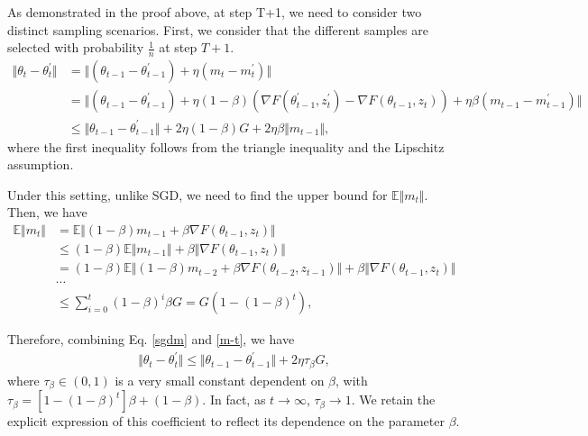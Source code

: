 As demonstrated in the proof above, at step T+1, we need to consider two distinct sampling scenarios. First, we consider that the different samples are selected with probability $\frac{1}{n}$ at step $T+1$.  
\begin{equation}\label{sgdm}
  \begin{aligned}
   \Vert \theta_t -\theta_t^{\prime} \Vert &= \Vert  (\theta_{t-1} - \theta_{t-1}^{\prime}) + \eta (m_t - m_t^{\prime})\Vert\\
   &= \Vert (\theta_{t-1} - \theta_{t-1}^{\prime}) + \eta (1-\beta)(\nabla F(\theta_{t-1}^{\prime},z_{t}^{\prime}) - \nabla F(\theta_{t-1},z_{t})) + \eta \beta(m_{t-1} - m_{t-1}^{\prime})\Vert\\
    &\leq \Vert\theta_{t-1} - \theta_{t-1}^{\prime}\Vert + 2\eta(1-\beta)G + 2\eta \beta\Vert m_{t-1}\Vert,
  \end{aligned}
 \end{equation}
where the first inequality follows from the triangle inequality and the Lipschitz assumption.

Under this setting, unlike SGD, we need to find the upper bound for $\mathbb{E} \Vert m_t\Vert$. Then, we have 
\begin{equation}\label{m-t}
  \begin{aligned}
   \mathbb{E} \Vert m_t\Vert &=  \mathbb{E} \Vert (1-\beta)m_{t-1} + \beta \nabla F(\theta_{t-1},z_t)\Vert \\
   &\leq (1-\beta)\mathbb{E} \Vert m_{t-1} \Vert + \beta \Vert\nabla F(\theta_{t-1},z_t)\Vert \\
   &= (1-\beta)\mathbb{E} \Vert (1-\beta)m_{t-2} + \beta \nabla F(\theta_{t-2},z_{t-1}) \Vert + \beta \Vert\nabla F(\theta_{t-1},z_t)\Vert \\
   &\cdots \\
   &\leq \sum_{i=0}^{t}(1-\beta)^i\beta G = G(1-(1-\beta)^t),
  \end{aligned}
 \end{equation}

Therefore, combining Eq. \ref{sgdm} and \ref{m-t}, we have
\begin{equation}
  \begin{aligned}
   \Vert \theta_t -\theta_t^{\prime} \Vert \leq \Vert\theta_{t-1} - \theta_{t-1}^{\prime}\Vert + 2\eta \tau_\beta G,
  \end{aligned}
 \end{equation}
where $\tau_\beta\in(0,1)$ is a very small constant dependent on $\beta$, with $\tau_\beta=[1-(1-\beta)^t]\beta+(1-\beta)$. In fact, as $t\rightarrow \infty$, $\tau_\beta \rightarrow 1$. We retain the explicit expression of this coefficient to reflect its dependence on the parameter $\beta$.

